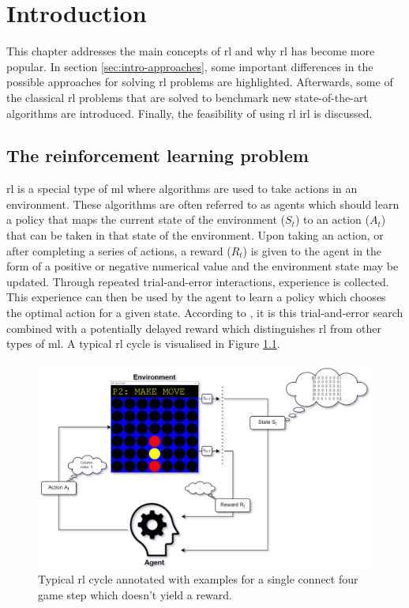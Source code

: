 \chapter{Introduction}
\label{ch:intro}

This chapter addresses the main concepts of \gls{rl} and why \gls{rl} has become more popular.
In section \ref{sec:intro-approaches}, some important differences in the possible approaches for solving \gls{rl} problems are highlighted.
Afterwards, some of the classical \gls{rl} problems that are solved to benchmark new state-of-the-art algorithms are introduced.
Finally, the feasibility of using \gls{rl} \gls{irl} is discussed.


\section{The reinforcement learning problem}
\label{sec:intro-problem}

\gls{rl} is a special type of \gls{ml} where algorithms are used to take actions in an environment.
These algorithms are often referred to as agents which should learn a policy that maps the current state of the environment ($S_t$) to an action ($A_t$) that can be taken in that state of the environment.
Upon taking an action, or after completing a series of actions, a reward ($R_t$) is given to the agent in the form of a positive or negative numerical value and the environment state may be updated.
Through repeated trial-and-error interactions, experience is collected.
This experience can then be used by the agent to learn a policy which chooses the optimal action for a given state.
According to \citet{rl_intro_handbook}, it is this trial-and-error search combined with a potentially delayed reward which distinguishes \gls{rl} from other types of \gls{ml}.
A typical \gls{rl} cycle is visualised in Figure \ref{fig:intro_rl_cycle}.

\begin{figure}[ht]
    \centering
    \includegraphics[width=0.9\linewidth]{images/rl_environment.png}
    \captionsetup{width=0.9\linewidth}
    \captionsetup{justification=centering}
    \caption{Typical \gls{rl} cycle annotated with examples for a single connect four game step which doesn't yield a reward.}
    \label{fig:intro_rl_cycle}
\end{figure}


